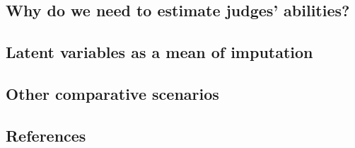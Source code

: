 \documentclass[
  authoryear,
  preprint,
  1p]{elsarticle}
\begin{document}
\subsection{Why do we need to estimate judges'
abilities?}\label{sec-appA}

\subsection{Latent variables as a mean of imputation}\label{sec-appB}

\subsection{Other comparative scenarios}\label{sec-appC}

\newpage{}

\subsection*{References}\label{references}

\renewcommand{\bibsection}{}

\end{document}
